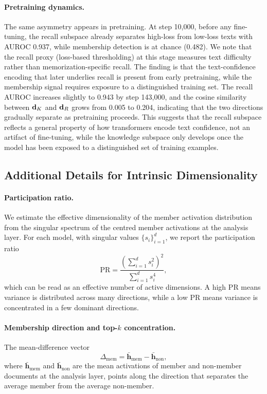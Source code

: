 \paragraph{Pretraining dynamics.}
The same asymmetry appears in pretraining.
At step 10{,}000, before any fine-tuning, the recall subspace already separates high-loss from low-loss texts with AUROC 0.937, while membership detection is at chance (0.482).
We note that the recall proxy (loss-based thresholding) at this stage measures text difficulty rather than memorization-specific recall. The finding is that the text-confidence encoding that later underlies recall is present from early pretraining, while the membership signal requires exposure to a distinguished training set.
The recall AUROC increases slightly to 0.943 by step 143{,}000, and the cosine similarity between $\mathbf{d}_K$ and $\mathbf{d}_R$ grows from 0.005 to 0.204, indicating that the two directions gradually separate as pretraining proceeds.
This suggests that the recall subspace reflects a general property of how transformers encode text confidence, not an artifact of fine-tuning, while the knowledge subspace only develops once the model has been exposed to a distinguished set of training examples.

\subsection{Additional Details for Intrinsic Dimensionality}
\label{app:dimensionality_details}

\paragraph{Participation ratio.}
We estimate the effective dimensionality of the member activation distribution from the singular spectrum of the centred member activations at the analysis layer. For each model, with singular values $\{s_i\}_{i=1}^{d}$, we report the participation ratio
\begin{equation}
\mathrm{PR} = \frac{\left(\sum_{i=1}^{d} s_i^2\right)^2}{\sum_{i=1}^{d} s_i^4},
\label{eq:participation_ratio}
\end{equation}
which can be read as an effective number of active dimensions. A high $\mathrm{PR}$ means variance is distributed across many directions, while a low $\mathrm{PR}$ means variance is concentrated in a few dominant directions.

\paragraph{Membership direction and top-$k$ concentration.}
The mean-difference vector
\begin{equation}
\Delta_{\mathrm{mem}} = \bar{\mathbf{h}}_{\mathrm{mem}} - \bar{\mathbf{h}}_{\mathrm{non}},
\label{eq:mean_difference_direction}
\end{equation}
where $\bar{\mathbf{h}}_{\mathrm{mem}}$ and $\bar{\mathbf{h}}_{\mathrm{non}}$ are the mean activations of member and non-member documents at the analysis layer, points along the direction that separates the average member from the average non-member.

